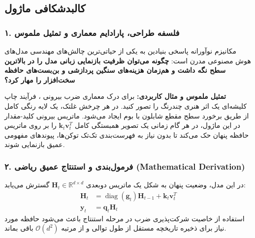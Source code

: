 \subsection{کالبدشکافی ماژول }

\subsubsection*{۱. فلسفه طراحی، پارادایم معماری و تمثیل ملموس}
مکانیزم نوآورانه  پاسخی بنیادین به یکی از حیاتی‌ترین چالش‌های مهندسی مدل‌های هوش مصنوعی مدرن است: \textbf{چگونه می‌توان ظرفیت بازنمایی زبانی مدل را در بالاترین سطح نگه داشت و هم‌زمان هزینه‌های سنگین پردازشی و بن‌بست‌های حافظه سخت‌افزار را مهار کرد؟}

\textbf{تمثیل ملموس و مثال کاربردی:}
برای درک معماری ضرب بیرونی ، فرآیند چاپ کلیشه‌ای یک اثر هنری چندرنگ را تصور کنید. در هر چرخش غلتک، یک لایه رنگی کامل از طریق برخورد سطح مقطع شابلون با بوم ایجاد می‌شود. ماتریس بیرونی کلید-مقدار در این ماژول، در هر گام زمانی یک تصویر همبستگی کامل $\mathbf{k}_t \mathbf{v}_t^T$ را بر روی ماتریس حافظه پنهان حک می‌کند تا بدون نیاز به فهرست‌بندی تک‌تک توکن‌ها، پیوندهای مفهومی عمیق بازنمایی شوند.

\subsubsection*{۲. فرمول‌بندی و استنتاج عمیق ریاضی (Mathematical Derivation)}
در این مدل، وضعیت پنهان به شکل یک ماتریس دوبعدی $\mathbf{H}_t \in \mathbb{R}^{d \times d}$ گسترش می‌یابد:
\begin{align}
\mathbf{H}_t &= \operatorname{diag}(\mathbf{g}_t) \mathbf{H}_{t-1} + \mathbf{k}_t \mathbf{v}_t^T \\
\mathbf{y}_t &= \mathbf{q}_t \mathbf{H}_t
\end{align}
استفاده از خاصیت شرکت‌پذیری ضرب در مرحله استنتاج باعث می‌شود حافظه مورد نیاز برای ذخیره تاریخچه مستقل از طول توالی و از مرتبه $\mathcal{O}(d^2)$ باقی بماند.

